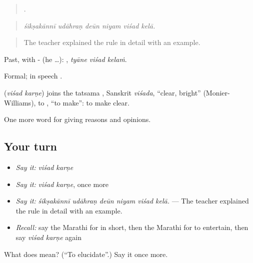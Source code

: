 \begin{quote}
     .
\end{quote}

\begin{quote}
\emph{śikṣakānnī udāhraṇ deūn niyam viśad kelā.}
\end{quote}

\begin{quote}
The teacher explained the rule in detail with an example.
\end{quote}

Past, with - (he …):   , \emph{tyāne viśad kelaṁ}.

Formal; in speech  .

\begin{cousinweb}
\textbf{ } (\emph{viśad karṇe}) joins the tatsama , Sanskrit \emph{viśada}, \textquotedblleft{}clear, bright\textquotedblright{} (Monier-Williams), to , \textquotedblleft{}to make\textquotedblright{}: to make clear.
\end{cousinweb}

\begin{grammarlens}[title={What you've built}]
One more word for giving reasons and opinions.
\end{grammarlens}

\subsection*{Your turn}
\begin{itemize}
\raggedright
  \item \emph{Say it:} \emph{viśad karṇe}
  \item \emph{Say it:} \emph{viśad karṇe}, once more
  \item \emph{Say it:} \emph{śikṣakānnī udāhraṇ deūn niyam viśad kelā.} — The teacher explained the rule in detail with an example.
  \item \emph{Recall:} say the Marathi for in short, then the Marathi for to entertain, then say \emph{viśad karṇe} again
\end{itemize}

\begin{tcolorbox}[breakable,colback=teal!4,colframe=teal!35!black,title={Before you move on}]
What does   mean? (\textquotedblleft{}To elucidate\textquotedblright{}.) Say it once more.
\end{tcolorbox}
